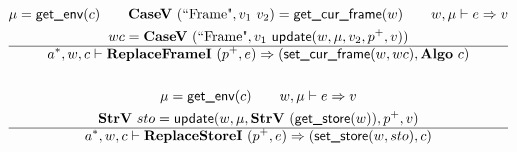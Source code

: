 \begin{gather*}
  \mu = \getenv(c) \qquad
  \casev ~ (\text{``Frame"}, v_1 ~ v_2) = \getcurframe(w) \qquad
  w, \mu \vdash e \Rightarrow v \\
  wc = \casev ~ (\text{``Frame"}, v_1 ~ \update(w, \mu, v_2, p^+, v)) \\
  \hline
  \seq{a}, w, c \vdash \replaceframei ~ (p^+, e) \Rightarrow
  (\setcurframe(w, wc), \algo ~ c) \\
%
\newline \\
  \mu = \getenv(c) \qquad
  w, \mu \vdash e \Rightarrow v \\
  \strv ~ sto = \update(w, \mu, \strv ~ (\getstore(w)), p^+, v) \\
  \hline
  \seq{a}, w, c \vdash \replacestorei ~ (p^+, e)
  \Rightarrow (\setstore(w, sto), c) \\
\end{gather*}

